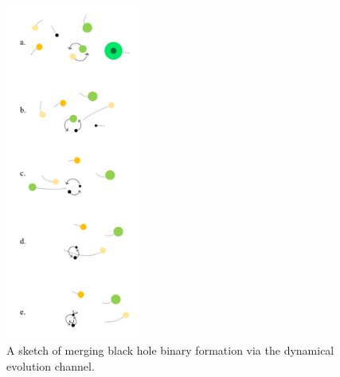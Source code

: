 \documentclass[iop,onecolumn]{revtex4-1}
\begin{document}
\begin{figure}
	\centering
	\includegraphics[width=0.4\textwidth]{channel3.png}
	\caption{\label{fig:dynamical} A sketch of merging black hole binary formation via the dynamical evolution channel.}
\end{figure}
\end{document}
